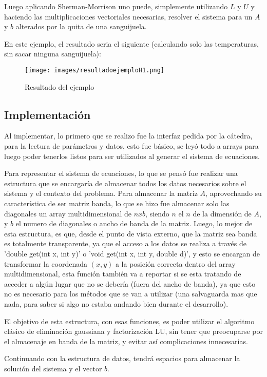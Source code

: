 \documentclass[a4paper]{article}
\begin{document}
Luego aplicando Sherman-Morrison uno puede, simplemente utilizando $L$ y $U$ y haciendo las multiplicaciones vectoriales necesarias, resolver el sistema para un $A$ y $b$ alterados por la quita de una sanguijuela.

En este ejemplo, el resultado seria el siguiente (calculando solo las temperaturas, sin sacar ninguna sanguijuela):
\begin{figure}[H]
\centering
\texttt{[image: images/resultadoejemploH1.png]}
\caption{Resultado del ejemplo}
\label{resultadoejemplo}
\end{figure}

%
%
\subsection{Implementación}
Al implementar, lo primero que se realizo fue la interfaz pedida por la cátedra, para la lectura de parámetros y datos, esto fue básico, se leyó todo a arrays para luego poder tenerlos listos para ser utilizados al generar el sistema de ecuaciones.

Para representar el sistema de ecuaciones, lo que se pensó fue realizar una estructura que se encargaría de almacenar todos los datos necesarios sobre el sistema y el contexto del problema. Para almacenar la matriz $A$, aprovechando su característica de ser matriz banda, lo que se hizo fue almacenar solo las diagonales un array multidimensional de $nxb$, siendo $n$ el $n$ de la dimensión de $A$, y $b$ el numero de diagonales o ancho de banda de la matriz. Luego, lo mejor de esta estructura, es que, desde el punto de vista externo, que la matriz sea banda es totalmente transparente, ya que el acceso a los datos se realiza a través de 'double get(int x, int y)' o 'void get(int x, int y, double d)', y esto se encargan de transformar la coordenada $(x,y)$ a la posición correcta dentro del array multidimensional, esta función también va a reportar si se esta tratando de acceder a algún lugar que no se debería (fuera del ancho de banda), ya que esto no es necesario para los métodos que se van a utilizar (una salvaguarda mas que nada, para saber si algo no estaba andando bien durante el desarrollo). 

El objetivo de esta estructura, con esas funciones, es poder utilizar el algoritmo clásico de eliminación gaussiana y factorización LU, sin tener que preocuparse por el almacenaje en banda de la matriz, y evitar así complicaciones innecesarias.\par
\smallskip
Continuando con la estructura de datos, tendrá espacios para almacenar la solución del sistema y el vector $b$.
\end{document}
